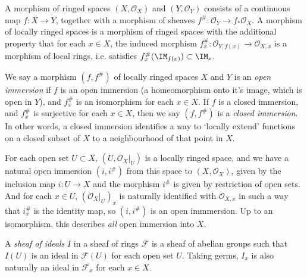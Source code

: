 A morphism of ringed spaces $(X,\mathcal{O}_X)$ and $(Y,\mathcal{O}_Y)$ consists of a continuous map $f: X \to Y$, together with a morphism of sheaves $f^\#: \mathcal{O}_Y \to f_* \mathcal{O}_X$. A morphism of locally ringed spaces is a morphism of ringed spaces with the additional property that for each $x \in X$, the induced morphism $f^\#_x: \mathcal{O}_{Y,f(x)} \to \mathcal{O}_{X,x}$ is a morphism of local rings, i.e. satisfies $f^\#_x(\IM_{f(x)}) \subset \IM_x$.

We say a morphism $(f,f^\#)$ of locally ringed spaces $X$ and $Y$ is an \emph{open immersion} if $f$ is an open immersion (a homeomorphism onto it's image, which is open in $Y$), and $f_x^\#$ is an isomorphism for each $x \in X$. If $f$ is a closed immersion, and $f_x^\#$ is surjective for each $x \in X$, then we say $(f,f^\#)$ is a \emph{closed immersion}. In other words, a closed immersion identifies a way to `locally extend' functions on a closed subset of $X$ to a neighbourhood of that point in $X$.

\begin{example}
    For each open set $U \subset X$, $(U,\mathcal{O}_X|_U)$ is a locally ringed space, and we have a natural open immersion $(i,i^\#)$ from this space to $(X,\mathcal{O}_X)$, given by the inclusion map $i: U \to X$ and the morphism $i^\#$ is given by restriction of open sets. And for each $x \in U$, $(\mathcal{O}_X|_U)_x$ is naturally identified with $\mathcal{O}_{X,x}$ in such a way that $i^\#_x$ is the identity map, so $(i,i^\#)$ is an open immmersion. Up to an isomorphism, this describes \emph{all} open immersion into $X$.
\end{example}

A \emph{sheaf of ideals} $I$ in a sheaf of rings $\mathcal{F}$ is a sheaf of abelian groups such that $I(U)$ is an ideal in $\mathcal{F}(U)$ for each open set $U$. Taking germs, $I_x$ is also naturally an ideal in $\mathcal{F}_x$ for each $x \in X$.

